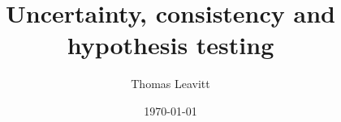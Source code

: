 \documentclass[table, xcolor = {dvipsnames}, 9pt]{beamer}
\title[]{Uncertainty, consistency and hypothesis testing} %
\author{Thomas Leavitt} %
\institute[] %
{
\medskip
\textit{} %
}
\date{\today} %
\theoremstyle{plain}
\begin{document}
\begin{frame}
\titlepage %
\end{frame}


\end{document}
